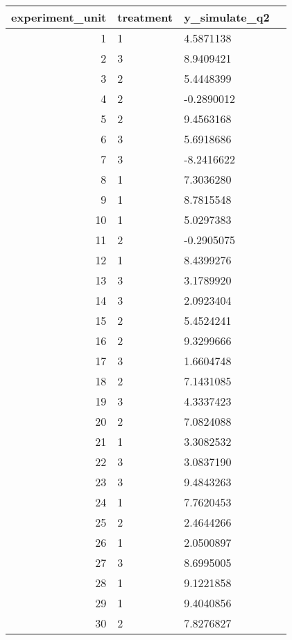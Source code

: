 \documentclass[11pt]{article}
\begin{document}
    \begin{tabular}{r|lll}
 experiment\_unit & treatment & y\_simulate\_q2\\
\hline
	  1         & 1          &  4.5871138\\
	  2         & 3          &  8.9409421\\
	  3         & 2          &  5.4448399\\
	  4         & 2          & -0.2890012\\
	  5         & 2          &  9.4563168\\
	  6         & 3          &  5.6918686\\
	  7         & 3          & -8.2416622\\
	  8         & 1          &  7.3036280\\
	  9         & 1          &  8.7815548\\
	 10         & 1          &  5.0297383\\
	 11         & 2          & -0.2905075\\
	 12         & 1          &  8.4399276\\
	 13         & 3          &  3.1789920\\
	 14         & 3          &  2.0923404\\
	 15         & 2          &  5.4524241\\
	 16         & 2          &  9.3299666\\
	 17         & 3          &  1.6604748\\
	 18         & 2          &  7.1431085\\
	 19         & 3          &  4.3337423\\
	 20         & 2          &  7.0824088\\
	 21         & 1          &  3.3082532\\
	 22         & 3          &  3.0837190\\
	 23         & 3          &  9.4843263\\
	 24         & 1          &  7.7620453\\
	 25         & 2          &  2.4644266\\
	 26         & 1          &  2.0500897\\
	 27         & 3          &  8.6995005\\
	 28         & 1          &  9.1221858\\
	 29         & 1          &  9.4040856\\
	 30         & 2          &  7.8276827\\
\end{tabular}
\end{document}
